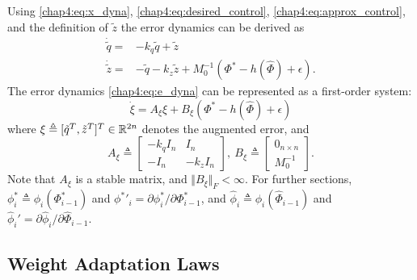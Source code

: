 Using \eqref{chap4:eq:x_dyna}, \eqref{chap4:eq:desired_control}, \eqref{chap4:eq:approx_control}, and the definition of $\tilde z$ the error dynamics can be derived as
\begin{equation}
    \begin{aligned}
        \dot {\tilde q} = & -{k_q} {\tilde q} + {\tilde z} \\
        \dot {\tilde z} = & -{\tilde q} -{k_z} {\tilde z} + M_0^{-1} (\Phi^*-h(\hat\Phi)+\epsilon).
    \end{aligned}
    \label{chap4:eq:e_dyna}
\end{equation}
The error dynamics \eqref{chap4:eq:e_dyna} can be represented as a first-order system: 
\begin{equation}
    \dot\xi = A_\xi \xi + B_\xi (\Phi^*-h(\hat\Phi)+\epsilon)
    \label{chap4:eq:xi_dyna}
\end{equation}
where 
$\xi\triangleq[{\tilde q}^T  , {\tilde z}^T  ]^T  \in\mathbb{R}^{2n}$ denotes the augmented error,
and
\begin{equation}
    A_\xi \triangleq 
    \begin{bmatrix}
        -{k_q} I_n &I_n\\-I_n& -{k_z} I_n
    \end{bmatrix}
    ,\ 
    B_\xi \triangleq 
    \begin{bmatrix}
        0_{n\times n}\\M_0^{-1}
    \end{bmatrix}.
\end{equation}
Note that $A_\xi$ is a stable matrix, and $\Vert B_\xi\Vert_F<\infty$.
For further sections, $\phi^*_i \triangleq\phi_i(\Phi^*_{i-1})$ and ${\phi^*}'_i = \partial \phi^*_i/\partial \Phi^*_{i-1}$, and $\hat\phi_i \triangleq\phi_i(\hat\Phi_{i-1})$ and $\hat\phi_i' = \partial \hat\phi_i/\partial \hat{\Phi}_{i-1}$.

\subsection{Weight Adaptation Laws}

